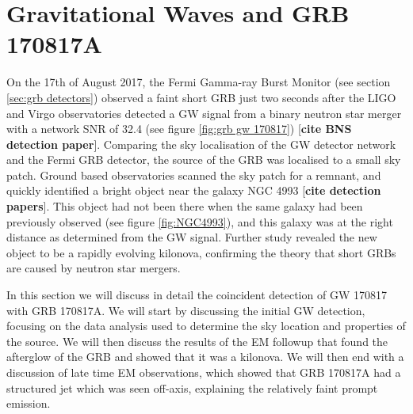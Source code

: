 \documentclass[11pt]{cuthesis}
\begin{document}
\section{Gravitational Waves and GRB 170817A} \label{sec:gw170817} 
On the 17th of August 2017, the Fermi Gamma-ray Burst Monitor (see section \ref{sec:grb detectors}) observed a faint short GRB just two seconds after the LIGO and Virgo observatories detected a GW signal from a binary neutron star merger with a network SNR of 32.4 (see figure \ref{fig:grb gw 170817}) [\textbf{cite BNS detection paper}]. Comparing the sky localisation of the GW detector network and the Fermi GRB detector, the source of the GRB was localised to a small sky patch. Ground based observatories scanned the sky patch for a remnant, and quickly identified a bright object near the galaxy NGC 4993 [\textbf{cite detection papers}]. This object had not been there when the same galaxy had been previously observed (see figure \ref{fig:NGC4993}), and this galaxy was at the right distance as determined from the GW signal. Further study revealed the new object to be a rapidly evolving kilonova, confirming the theory that short GRBs are caused by neutron star mergers. 

In this section we will discuss in detail the coincident detection of GW 170817 with GRB 170817A. We will start by discussing the initial GW detection, focusing on the data analysis used to determine the sky location and properties of the source. We will then discuss the results of the EM followup that found the afterglow of the GRB and showed that it was a kilonova. We will then end with a discussion of late time EM observations, which showed that GRB 170817A had a structured jet which was seen off-axis, explaining the relatively faint prompt emission.
\end{document}
